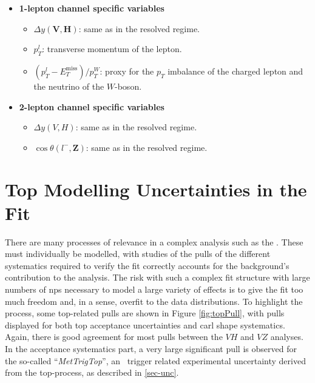\begin{itemize}
\begin{itemize}
  \end{itemize}
  \item \textbf{1-lepton channel specific variables}
  \begin{itemize}
      \item $\Delta y(\boldsymbol{V},\boldsymbol{H})$: same as in the resolved regime.
      \item $p_T^l$: transverse momentum of the lepton.
      \item $(p_T^{l} - E_T^{\textrm{miss}})/p_T^W$:  proxy for the $p_T$ imbalance of the charged lepton and the neutrino of the $W$-boson.
  \end{itemize}
  \item \textbf{2-lepton channel specific variables}
  \begin{itemize}
      \item $\Delta y(\textbf{$V$},\textbf{$H$})$: same as in the resolved regime.
      \item $\cos{\theta(\textbf{$l^-$},\textbf{Z})}$: same as in the resolved regime.
  \end{itemize}
\end{itemize}

\clearpage
\section{Top Modelling Uncertainties in the Fit}
There are many processes of relevance in a complex analysis such as the \vhbc. These must individually be modelled, with studies of the pulls of the different systematics required to verify the fit correctly accounts for the background's contribution to the analysis. The risk with such a complex fit structure with large numbers of \glspl{np} necessary to model a large variety of effects is to give the fit too much freedom and, in a sense, overfit to the data distributions. To highlight the process, some top-related pulls are shown in Figure \ref{fig:topPull}, with pulls displayed for both top acceptance uncertainties and \gls{carl} shape systematics. Again, there is good agreement for most pulls between the $VH$ and $VZ$ analyses. In the acceptance systematics part, a very large significant pull is observed for the so-called ``\textit{MetTrigTop}'', an \etm\ trigger related experimental uncertainty derived from the top-process, as described in \ref{sec-unc}. 

